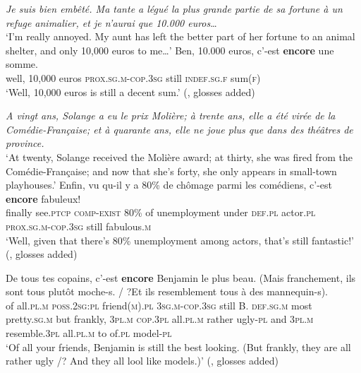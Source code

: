 \begin{exe}
	\ex\label{exAppendixFrenchEncoreMarginal1}
	\begin{xlist}
		\textit{Je suis bien embêté. Ma tante a légué la plus grande partie de sa fortune à un refuge animalier, et je n’aurai que 10.000 euros}…\\
		\lq I’m really annoyed. My aunt has left the better part of her fortune to an animal shelter, and only 10,000 euros to me…'
		\gll Ben, 10.000 euros, c'-est \textbf{encore} une somme.\\
	well, 10,000 euros \textsc{prox}.\textsc{sg}.\textsc{m}-\textsc{cop}.3\textsc{sg} still \textsc{indef}.\textsc{sg}.\textsc{f} sum(\textsc{f})\\
		\glt \lq Well, 10,000 euros is still a decent sum.' (\cite[172]{MosegaardHansen2008}, glosses added)
\end{xlist}
	
	\ex\label{exAppendixFrenchEncoreMarginal2}
	\begin{xlist}
		\textit{A vingt ans, Solange a eu le prix Molière; à trente ans, elle a été virée de la Comédie-Française; et à quarante ans, elle ne joue plus que dans des théâtres de province.}\\
		\lq At twenty, Solange received the Molière award; at thirty, she was fired from the Comédie-Française; and now that she’s forty, she only appears in small-town playhouses.'
		\gll Enfin, vu qu-{il y a} 80\% de chômage parmi les comédiens, c’-est \textbf{encore} fabuleux!\\
		finally see.\textsc{ptcp} \textsc{comp}-\textsc{exist} 80\% of unemployment under \textsc{def}.\textsc{pl} actor.\textsc{pl} \textsc{prox}.\textsc{sg}.\textsc{m}-\textsc{cop}.3\textsc{sg} still fabulous.\textsc{m}\\
		\glt \lq Well, given that there’s 80\% unemployment among actors, that’s still fantastic!' (\cite[176]{MosegaardHansen2008}, glosses added)
	\end{xlist}
	
	\ex\label{exAppendixFrenchEncoreMarginal3}
	\gll De tous tes copains, c'-est \textbf{encore} Benjamin le plus beau. \textup{(}Mais franchement, ils sont tous plutôt moche-s. \textup{/} \textup{?}Et ils resemblement tous à des mannequin-s\textup{)}.\\
	of all.\textsc{pl}.\textsc{m} \textsc{poss}.2\textsc{sg}:\textsc{pl} friend(\textsc{m}).\textsc{pl} 3\textsc{sg}.\textsc{m}-\textsc{cop}.3\textsc{sg} still B. \textsc{def}.\textsc{sg}.\textsc{m} most pretty.\textsc{sg}.\textsc{m} \phantom{(}but frankly, 3\textsc{pl}.\textsc{m} \textsc{cop}.3\textsc{pl} all.\textsc{pl}.\textsc{m} rather ugly-\textsc{pl} {} \phantom{(}and 3\textsc{pl}.\textsc{m} resemble.3\textsc{pl} all.\textsc{pl}.\textsc{m} to of.\textsc{pl} model-\textsc{pl}\\
	\glt \lq Of all your friends, Benjamin is still the best looking. (But frankly, they are all rather ugly /? And they all lool like models.)' (\cite[37]{MosegaardHansen2008}, glosses added)
	

\end{exe}
